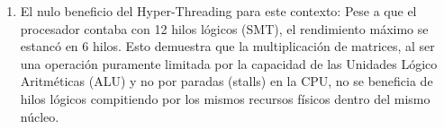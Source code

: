 \begin{enumerate}
   \item El nulo beneficio del Hyper-Threading para este contexto: Pese a que el procesador contaba con 12 hilos lógicos (SMT), el rendimiento máximo se estancó en 6 hilos. Esto demuestra que la multiplicación de matrices, al ser una operación puramente limitada por la capacidad de las Unidades Lógico Aritméticas (ALU) y no por paradas (stalls) en la CPU, no se beneficia de hilos lógicos compitiendo por los mismos recursos físicos dentro del mismo núcleo.
\end{enumerate}
